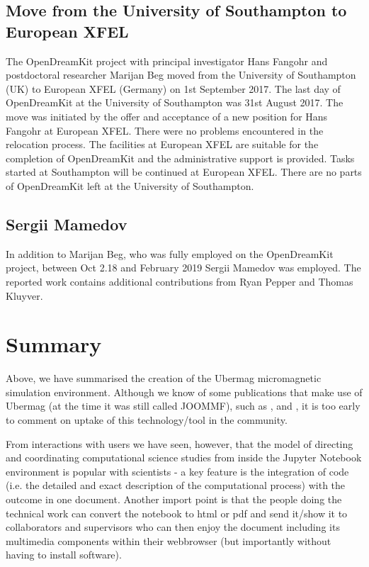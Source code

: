 \documentclass{deliverablereport}
\begin{document}
\subsection{Move from the University of Southampton to European XFEL}

The OpenDreamKit project with principal investigator Hans Fangohr and
postdoctoral researcher Marijan Beg moved from the University of
Southampton (UK) to European XFEL (Germany) on 1st September 2017. The
last day of OpenDreamKit at the University of Southampton was 31st
August 2017. The move was initiated by the offer and acceptance of a
new position for Hans Fangohr at European XFEL. There were no problems
encountered in the relocation process. The facilities at European XFEL
are suitable for the completion of OpenDreamKit and the administrative
support is provided. Tasks started at Southampton will be continued at
European XFEL. There are no parts of OpenDreamKit left at the
University of Southampton.

\subsection{Sergii Mamedov}

In addition to Marijan Beg, who was fully employed on the OpenDreamKit
project, between Oct 2.18 and February 2019 Sergii Mamedov was
employed. The reported work contains additional contributions from
Ryan Pepper and Thomas Kluyver.

\section{Summary}

Above, we have summarised the creation of the Ubermag micromagnetic
simulation environment. Although we know of some publications that
make use of Ubermag (at the time it was still called JOOMMF), such as
 \cite{Cortes2018}, \cite{Gilbert2019} and \cite{Kannan2019}, it is too
early to comment on uptake of this technology/tool in the community.

From interactions with users we have seen, however, that the model of
directing and coordinating computational science studies from inside
the Jupyter Notebook environment is popular with scientists - a key
feature is the integration of code (i.e. the detailed and exact
description of the computational process) with the outcome in one
document. Another import point is that the people doing the technical
work can convert the notebook to html or pdf and send it/show it to
collaborators and supervisors who can then enjoy the document
including its multimedia components within their webbrowser (but
importantly without having to install software).
\end{document}
